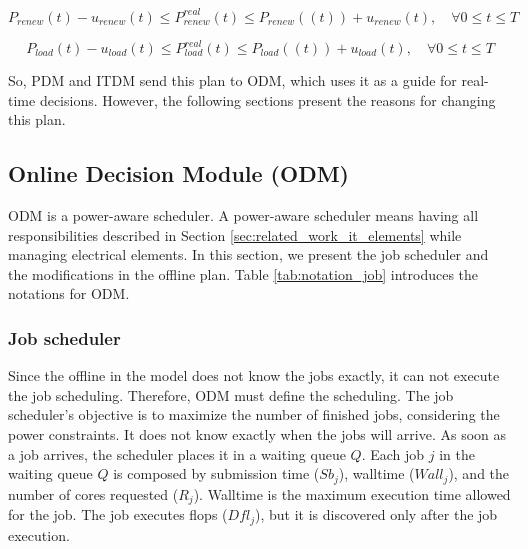 \begin{equation}
    P_{renew}(t) - u_{renew}(t) \le P^{real}_{renew}(t) \le P_{renew}((t)) + u_{renew}(t), \quad \forall 0 \le t \le T
    \label{equ:uncertainty_power}
\end{equation}

\begin{equation}
    P_{load}(t) - u_{load}(t) \le P^{real}_{load}(t) \le P_{load}((t)) + u_{load}(t), \quad \forall 0 \le t \le T
    \label{equ:uncertainty_load}
\end{equation}

So, PDM and ITDM send this plan to ODM, which uses it as a guide for real-time decisions. However, the following sections present the reasons for changing this plan.

\subsection{Online Decision Module (ODM)}
\label{sec:ODM}

ODM is a power-aware scheduler. A power-aware scheduler means having all responsibilities described in Section \ref{sec:related_work_it_elements} while managing electrical elements. In this section, we present the job scheduler and the modifications in the offline plan. Table \ref{tab:notation_job} introduces the notations for ODM.



\subsubsection{Job scheduler}

Since the offline in the model does not know the jobs exactly, it can not execute the job scheduling. Therefore, ODM must define the scheduling. The job scheduler's objective is to maximize the number of finished jobs, considering the power constraints. It does not know exactly when the jobs will arrive. As soon as a job arrives, the scheduler places it in a waiting queue $Q$. Each job $j$ in the waiting queue $Q$ is composed by submission time ($Sb_j$), walltime ($Wall_j$), and the number of cores requested ($R_j$). Walltime is the maximum execution time allowed for the job. The job executes flops ($Dfl_j$), but it is discovered only after the job execution.

